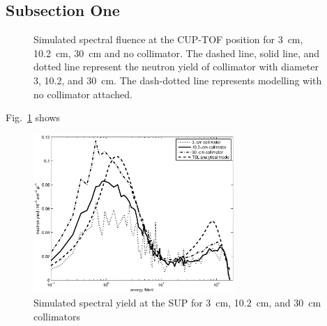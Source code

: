 \documentclass[12pt,journal]{IEEEtran}
\let\MYoriglatexcaption\caption
\renewcommand{\caption}[2][\relax]{\MYoriglatexcaption[#2]{#2}}
\begin{document}
\subsection{Subsection One}
\begin{figure}[!t]
	\centering
	\hfil
	\caption{Simulated spectral fluence at the CUP-TOF position for \SI{3}{\cm}, \SI{10.2}{\cm}, \SI{30}{\cm} and no collimator. The dashed line, solid line, and dotted line represent the neutron yield of collimator with diameter 3, 10.2, and \SI{30}{\cm}. The dash-dotted line represents modelling with no collimator attached.}
	\label{fig_LethargylinearspaceFor4collimators}
\end{figure}

Fig.~\ref{fig_LethargylinearspaceFor4collimators} shows

\begin{figure}[!t]
	\centering
	\includegraphics[width=3in]{SUPcomparedlinearspace.eps}
	\caption{Simulated spectral yield at the SUP for \SI{3}{\cm}, \SI{10.2}{\cm}, and \SI{30}{\cm} collimators}
	\label{fig:SUPcomparedlinearspace}
\end{figure}
\end{document}
